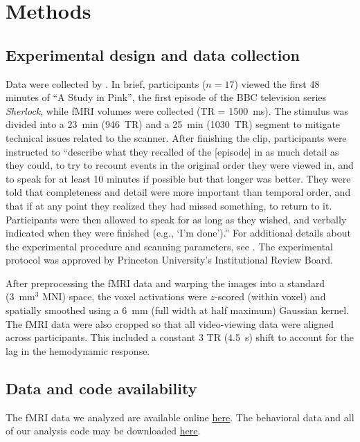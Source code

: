 \documentclass{article}
\begin{document}
\section*{Methods}
\label{sec:methods}

\subsection*{Experimental design and data collection}
Data were collected by \cite{ChenEtal17}.  In brief, participants ($n=17$) viewed the first 48 minutes of ``A Study in Pink'', the first episode of the BBC television series \textit{Sherlock}, while fMRI volumes were collected (TR = 1500~ms).  The stimulus was divided into a 23~min (946~TR) and a 25~min (1030~TR) segment to mitigate technical issues related to the scanner.  After finishing the clip, participants were instructed to \citep[quoting from][]{ChenEtal17} ``describe what they recalled of the [episode] in as much detail as they could, to try to recount events in the original order they were viewed in, and to speak for at least 10 minutes if possible but that longer was better. They were told that completeness and detail were more important than temporal order, and that if at any point they realized they had missed something, to return to it. Participants were then allowed to speak for as long as they wished, and verbally indicated when they were finished (e.g., `I’m done').''  For additional details about the experimental procedure and scanning parameters, see \cite{ChenEtal17}.  The experimental protocol was approved by Princeton University's Institutional Review Board.

After preprocessing the fMRI data and warping the images into a standard (3~mm$^3$ MNI) space, the voxel activations were $z$-scored (within voxel) and spatially smoothed using a 6~mm (full width at half maximum) Gaussian kernel.  The fMRI data were also cropped so that all video-viewing data were aligned across participants.  This included a constant 3 TR (4.5~s) shift to account for the lag in the hemodynamic response.  \citep[All of these preprocessing steps followed][where additional details may be found.]{ChenEtal17}

\subsection*{Data and code availability}
The fMRI data we analyzed are available online \href{http://dataspace.princeton.edu/jspui/handle/88435/dsp01nz8062179}{\underline{here}}.  The behavioral data and all of our analysis code may be downloaded \href{https://github.com/ContextLab/sherlock-topic-model-paper}{\underline{here}}.
\end{document}
